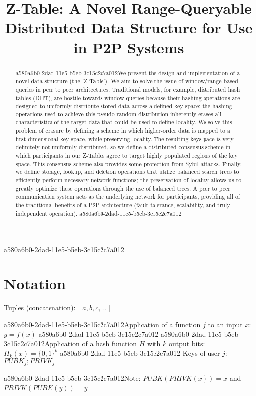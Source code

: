 \documentclass[12pt]{article}
\title{Z-Table: A Novel Range-Queryable Distributed Data Structure for Use in P2P Systems}
\begin{document}
\maketitle

\begin{abstract}
a580a6b0-2dad-11e5-b5eb-3c15c2c7a012We present the design and implementation of a novel data structure (the 'Z-Table'). We aim to solve the issue of window/range-based queries in peer to peer architectures. Traditional models, for example,  distributed hash tables (DHT), are hostile towards window queries because their hashing operations are designed to uniformly distribute stored data across a defined key space; the hashing operations used to achieve this pseudo-random distribution inherently erases all characteristics of the target data that could be used to define locality. We solve this problem of erasure by defining a scheme in which higher-order data is mapped to a first-dimensional key space, while preserving locality. The resulting keys pace is very definitely not uniformly distributed, so we define a distributed consensus scheme in which participants in our Z-Tables agree to target highly populated regions of the key space. This consensus scheme also provides some protection from Sybil attacks. Finally, we define storage, lookup, and deletion operations that utilize balanced search trees to efficiently perform necessary network functions; the preservation of locality allows us to greatly optimize these operations through the use of balanced trees. A peer to peer communication system acts as the underlying network for participants, providing all of the traditional benefits of a P2P architecture (fault tolerance, scalability, and truly independent operation).
a580a6b0-2dad-11e5-b5eb-3c15c2c7a012\end{abstract}

a580a6b0-2dad-11e5-b5eb-3c15c2c7a012\section{Notation}

Tuples (concatenation): $[a,b,c,...]$

a580a6b0-2dad-11e5-b5eb-3c15c2c7a012Application of a function $f$ to an input $x$: $y=f(x)$
a580a6b0-2dad-11e5-b5eb-3c15c2c7a012
a580a6b0-2dad-11e5-b5eb-3c15c2c7a012Application of a hash function $H$ with $k$ output bits: $H_{k}(x) = \{0,1\}^k$
a580a6b0-2dad-11e5-b5eb-3c15c2c7a012
Keys of user $j$: $ PUBK_j; PRIVK_j $

a580a6b0-2dad-11e5-b5eb-3c15c2c7a012Note: $PUBK(PRIVK(x)) = x$ and $PRIVK(PUBK(y)) = y$~
\end{document}
